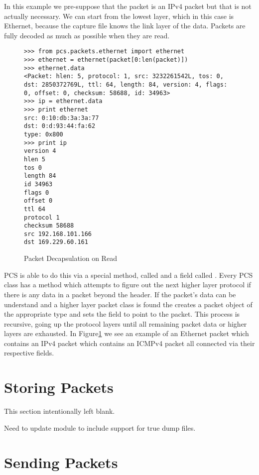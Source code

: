 \documentclass[11pt]{article}
\begin{document}
In this example we pre-suppose that the packet is an IPv4 packet but
that is not actually necessary.  We can start from the lowest layer,
which in this case is Ethernet, because the capture file knows the
link layer of the data.  Packets are fully decoded as much as possible
when they are read.  

\begin{figure}
  \centering
\begin{verbatim}
>>> from pcs.packets.ethernet import ethernet
>>> ethernet = ethernet(packet[0:len(packet)])
>>> ethernet.data
<Packet: hlen: 5, protocol: 1, src: 3232261542L, tos: 0, dst: 2850372769L, ttl: 64, length: 84, version: 4, flags: 0, offset: 0, checksum: 58688, id: 34963>
>>> ip = ethernet.data
>>> print ethernet
src: 0:10:db:3a:3a:77
dst: 0:d:93:44:fa:62
type: 0x800
>>> print ip
version 4
hlen 5
tos 0
length 84
id 34963
flags 0
offset 0
ttl 64
protocol 1
checksum 58688
src 192.168.101.166
dst 169.229.60.161

\end{verbatim}
  \caption{Packet Decapsulation on Read}
  \label{fig:packet-decapsulation-on-read}
\end{figure}

PCS is able to do this via a special method, called  and
a field called .  Every PCS class has a 
method which attempts to figure out the next higher layer protocol if
there is any data in a packet beyond the header.  If the packet's data
can be understand and a higher layer packet class is found the
 creates a packet object of the appropriate type and
sets the  field to point to the packet.  This process is
recursive, going up the protocol layers until all remaining packet
data or higher layers are exhausted.  In
Figure\ref{fig:packet-decapsulation-on-read} we see an example of an
Ethernet packet which contains an IPv4 packet which contains an ICMPv4
packet all connected via their respective  fields.

\section{Storing Packets}

This section intentionally left blank.

Need to update  module to include support for true dump
files.

\section{Sending Packets}
\label{sec:sending-packets}
\end{document}
